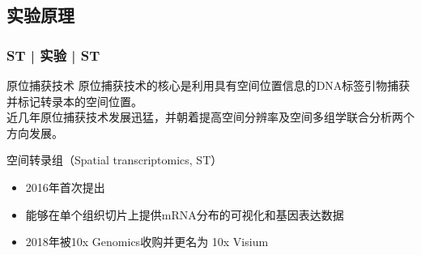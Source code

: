 \documentclass[11pt]{ctexbeamer}
\begin{document}
%
%


\subsection{实验原理}
\begin{frame}
	\frametitle{ST | 实验 | ST}
	\begin{block}{原位捕获技术}
		原位捕获技术的核心是利用具有空间位置信息的DNA标签引物捕获并标记转录本的空间位置。\\
		近几年原位捕获技术发展迅猛，并朝着\alert{提高空间分辨率及空间多组学联合分析}两个方向发展。
		\end{block}
		\begin{block}{空间转录组（Spatial transcriptomics, ST）}
       \begin{itemize}
       	\item 2016年首次提出
       	\item 能够在单个组织切片上提供mRNA分布的可视化和基因表达数据
       	\item 2018年被10x Genomics收购并更名为 \alert{10x Visium}
       \end{itemize}
	\end{block}
\end{frame}
\end{document}
